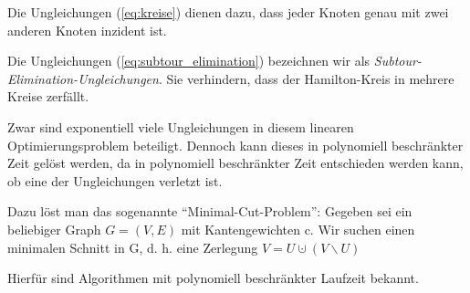 \documentclass[10pt]{scrbook}
\begin{document}
\begin{Bem}
Die Ungleichungen (\ref{eq:kreise}) dienen dazu, dass jeder Knoten genau mit zwei anderen Knoten inzident ist.

Die Ungleichungen (\ref{eq:subtour_elimination}) bezeichnen wir als \emph{Subtour-Elimination-Ungleichungen}. Sie verhindern, dass der Hamilton-Kreis in mehrere Kreise zerfällt.
\end{Bem}

\begin{Bem}
Zwar sind exponentiell viele Ungleichungen in diesem linearen Optimierungsproblem beteiligt. Dennoch kann dieses in polynomiell beschränkter Zeit gelöst werden, da in polynomiell beschränkter Zeit entschieden werden kann, ob eine der Ungleichungen verletzt ist.

Dazu löst man das sogenannte "`Minimal-Cut-Problem"': Gegeben sei ein beliebiger Graph $G=(V, E)$ mit Kantengewichten c. Wir suchen einen minimalen Schnitt in G, d. h. eine Zerlegung $V=U\cupdot (V\backslash U)$ 

Hierfür sind Algorithmen mit polynomiell beschränkter Laufzeit bekannt.
\end{Bem}
\end{document}
